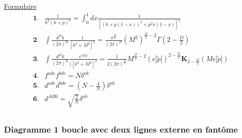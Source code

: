 \documentclass[a4paper,11pt]{article} %
\theoremstyle{plain}
\theoremstyle{definition}
\theoremstyle{remark}
\numberwithin{equation}{section}
\numberwithin{equation}{subsection}
\numberwithin{figure}{section}
\begin{document}
\noindent
\underline{Formulaire}
\begin{eqnarray*}
 &\textbf{1.}& \frac{1}{k^2 (k+p)^2 }  =  \int_{0}^{1}   dx  \frac{1}{ \left[ (k+p(1-x))^2  +  p^2 x(1-x) \right]^2  }  \\
 &\textbf{2.}&  \int  \frac{d^D k}{(2 \pi)^D}   \frac{1}{\left[ k^2 + M^2 \right]^2 }  =  \frac{ \pi^{\frac{D}{2}} }{ (2 \pi)^{D}  }  (M^2)^{\frac{D}{2}-2} \Gamma(2-\frac{D}{2}) \\
 &\textbf{3.}& \int  \frac{d^D k}{(2 \pi)^D}   \frac{e^{ik \epsilon \tilde{p}}}{(\left[ k^2 + M^2 \right]^2 }  =   \frac{1}{2 (2 \pi )^{ \frac{D}{2}}}  M^{\frac{D}{2} - 2}  \left( \epsilon \left| \tilde{p}  \right|  \right)^{ 2-\frac{D}{2} }   \textbf{K}_{2- \frac{D}{2}  } ( M  \epsilon \left| \tilde{p}  \right|  )   \\
&\textbf{4.}&  f^{ade} f^{bde}  =  N  \delta^{ab}  \\
&\textbf{5.}&  d^{ade} d^{bde}  =  \left( N - \frac{4}{N} \right)  \delta^{ab}  \\
&\textbf{6.}&  d^{AB0} = \sqrt{\frac{2}{N}}  \delta^{ab}  \\
\end{eqnarray*}

    \subsubsection{Diagramme 1 boucle avec deux lignes externe en fantôme}
\end{document}
